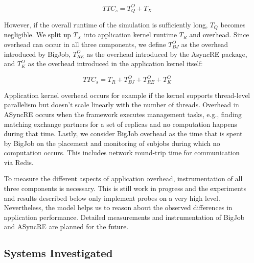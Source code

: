 \documentclass{sig-alternate}
\begin{document}
$$ TTC_s = T^{O}_Q + T_X $$

However, if the overall runtime of the simulation is sufficiently long, 
$T_Q$ becomes negligible. We split up $T_X$ into application 
kernel runtime $T_R$ and overhead. Since overhead can occur in all three
components, we define $T^{O}_{BJ}$ as the overhead introduced by BigJob,
$T^{O}_{RE}$ as the overhead introduced by the AsyncRE package, and 
$T^{O}_{K}$ as the overhead introduced in the application kernel itself:

$$ TTC_s = T_R + T^{O}_{BJ} + T^{O}_{RE} + T^{O}_{K}$$

Application kernel overhead occurs for example if the kernel supports 
thread-level parallelism but doesn't scale linearly with the number of 
threads. Overhead in ASyncRE occurs when the framework executes management 
tasks, e.g., finding matching exchange partners for a set of replicas and 
no computation happens during that time. Lastly, we consider BigJob 
overhead as the time that is spent by BigJob on the placement and monitoring 
of subjobs during which no computation occurs. This includes network
round-trip time for communication via Redis.

To measure the different aspects of application overhead, instrumentation 
of all three components is necessary. This is still work in progress and 
the experiments and results described below only implement probes on a 
very high level. Nevertheless, the model helps us to reason about the observed 
differences in application performance. Detailed measurements and 
instrumentation of BigJob and ASyncRE are planned for the future. 


\subsection{Systems Investigated} 
\end{document}
